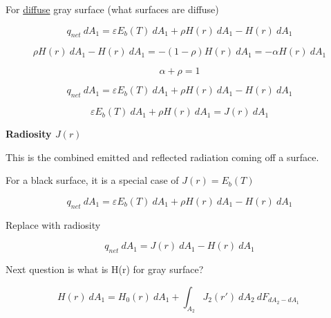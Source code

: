 \documentclass[12pt]{article}
\renewcommand{\_}{\kern-1.5pt\textunderscore\kern-1.5pt}
\begin{document}
For \uline{diffuse} gray surface (what surfaces are diffuse)\par

\par

 \[ q_{net}~dA_{1}= \varepsilon  E_{b} \left( T \right) ~dA_{1}+ \rho H \left( r \right) ~dA_{1}-H \left( r \right) ~dA_{1} \] \par

 \[  \rho H \left( r \right) ~dA_{1}-H \left( r \right) ~dA_{1}=- \left( 1- \rho  \right) H \left( r \right) ~dA_{1}=- \alpha  H \left( r \right) ~dA_{1} \] \par

 \[  \alpha + \rho =1 \] \par

 \[ q_{net}~dA_{1}= \varepsilon  E_{b} \left( T \right) ~dA_{1}+ \rho H \left( r \right) ~dA_{1}-H \left( r \right) ~dA_{1} \] \par

 \[  \varepsilon  E_{b} \left( T \right) ~dA_{1}+ \rho H \left( r \right) ~dA_{1}=J \left( r \right) ~dA_{1} \] \par

\textbf{Radiosity  \( J \left( r \right)  \) }\par

This is the combined emitted and reflected radiation coming off a surface.\par

For a black surface, it is a special case of  \( J \left( r \right) =E_{b} \left( T \right)  \) \par

 \[ q_{net}~dA_{1}= \varepsilon  E_{b} \left( T \right) ~dA_{1}+ \rho H \left( r \right) ~dA_{1}-H \left( r \right) ~dA_{1} \] \par

Replace with radiosity\par

 \[ q_{net}~dA_{1}=J \left( r \right) ~dA_{1}-H \left( r \right) ~dA_{1} \] \par

Next question is what is H(r) for gray surface?\par

\par

 \[ H \left( r \right) ~dA_{1}=H_{0} \left( r \right) ~dA_{1}+ \int _{A_{2}}^{}J_{2} \left( r' \right) ~dA_{2}~dF_{dA_{2}-dA_{1}}~ \] \par
\end{document}

